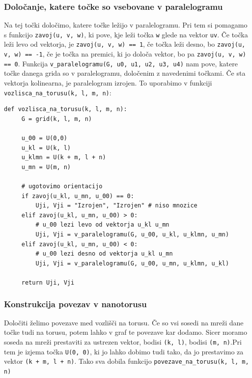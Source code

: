 \documentclass[a4paper, 10 pt, titlepage]{article}
\begin{document}
\subsubsection{Določanje, katere točke so vsebovane v paralelogramu}

Na tej točki določimo, katere točke ležijo v paralelogramu. Pri tem si pomagamo s funkcijo \texttt{zavoj(u, v, w)}, ki pove, kje leži točka \texttt{w} glede na vektor \texttt{uv}. Če točka leži levo od vektorja, je \texttt{zavoj(u, v, w) == 1}, če točka leži desno, bo \texttt{zavoj(u, v, w) == -1}, če je točka na premici, ki jo določa vektor, bo pa \texttt{zavoj(u, v, w) == 0}. Funkcija \texttt{v\_paralelogramu(G, u0, u1, u2, u3, u4)} nam pove, katere točke danega grida so v paralelogramu, določenim z navedenimi točkami. Če sta vektorja kolinearna, je paralelogram izrojen. To uporabimo v funkciji \texttt{vozlisca\_na\_torusu(k, l, m, n)}:

\begin{verbatim}
def vozlisca_na_torusu(k, l, m, n):
     G = grid(k, l, m, n)
    
     u_00 = U(0,0)
     u_kl = U(k, l)
     u_klmn = U(k + m, l + n)
     u_mn = U(m, n)

     # ugotovimo orientacijo
     if zavoj(u_kl, u_mn, u_00) == 0:
         Uji, Vji = "Izrojen", "Izrojen" # niso mnozice
     elif zavoj(u_kl, u_mn, u_00) > 0:
         # u_00 lezi levo od vektorja u_kl u_mn
         Uji, Vji = v_paralelogramu(G, u_00, u_kl, u_klmn, u_mn)
     elif zavoj(u_kl, u_mn, u_00) < 0:
         # u_00 lezi desno od vektorja u_kl u_mn
         Uji, Vji = v_paralelogramu(G, u_00, u_mn, u_klmn, u_kl)
    
     return Uji, Vji
\end{verbatim}

\subsubsection{Konstrukcija povezav v nanotorusu}

Določiti želimo povezave med vozlišči na torusu. Če so vsi sosedi na mreži dane točke tudi na torusu, potem lahko v graf te povezave kar dodamo. Sicer moramo soseda na mreži prestaviti za ustrezen vektor, bodisi \texttt{(k, l)}, bodisi \texttt{(m, n)}.Pri tem je izjema točka \texttt{U(0, 0)}, ki jo lahko dobimo tudi tako, da jo prestavimo za vektor \texttt{(k + m, l + n)}.  Tako sva dobila funkcijo \texttt{povezave\_na\_torusu(k, l, m, n)}
\end{document}

